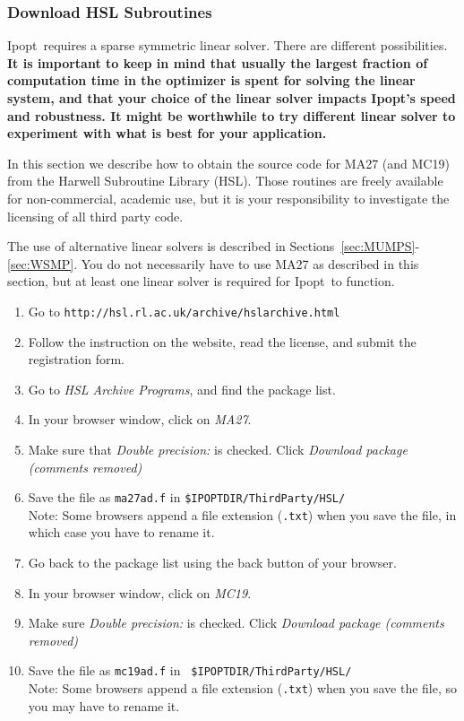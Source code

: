 \documentclass[10pt]{article}
\newcommand{\Ipopt}{{\sc Ipopt}}
\begin{document}
\subsubsection{Download HSL Subroutines}
\Ipopt\ requires a sparse symmetric linear solver.  There are
different possibilities.  {\bf It is important to keep in mind that usually
the largest fraction of computation time in the optimizer is spent for
solving the linear system, and that your choice of the linear solver
impacts \Ipopt's speed and robustness.  It might be worthwhile to try
different linear solver to experiment with what is best for your
application.}

In this section we describe how to obtain the source code for MA27
(and MC19) from the Harwell Subroutine Library (HSL).  Those routines
are freely available for non-commercial, academic use, but it is your
responsibility to investigate the licensing of all third party code.

The use of alternative linear solvers is described in
Sections~\ref{sec:MUMPS}-\ref{sec:WSMP}.  You do not necessarily
have to use MA27 as described in this section, but at least one linear
solver is required for \Ipopt\ to function.

\begin{enumerate}
\item Go to {\tt http://hsl.rl.ac.uk/archive/hslarchive.html}
\item Follow the instruction on the website, read the license, and
  submit the registration form.
\item Go to \textit{HSL Archive Programs}, and find the package list.
\item In your browser window, click on \textit{MA27}.
\item Make sure that \textit{Double precision:} is checked. 
  Click \textit{Download package (comments removed)}
\item Save the file as {\tt ma27ad.f} in {\tt \$IPOPTDIR/ThirdParty/HSL/}\\
  Note: Some browsers append a file extension ({\tt .txt}) when you save
  the file, in which case you have to rename it.
\item Go back to the package list using the back button of your browser.
\item In your browser window, click on \textit{MC19}.
\item Make sure \textit{Double precision:} is checked. Click 
  \textit{Download package (comments removed)}
\item Save the file as {\tt mc19ad.f} in {\tt
    \$IPOPTDIR/ThirdParty/HSL/}\\
  Note: Some browsers append a file extension ({\tt .txt}) when you save
  the file, so you may have to rename it.
\end{enumerate}
\end{document}

